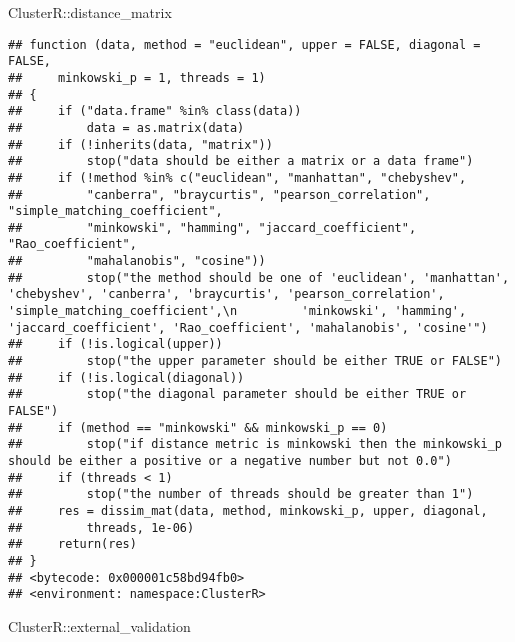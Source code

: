 \documentclass[
]{article}
\newenvironment{Shaded}{\begin{snugshade}}{\end{snugshade}}
\newcommand{\NormalTok}[1]{#1}
\newcommand{\SpecialCharTok}[1]{\textcolor[rgb]{0.00,0.00,0.00}{#1}}
\begin{document}
\begin{Shaded}
\begin{Highlighting}[]
\NormalTok{ClusterR}\SpecialCharTok{::}\NormalTok{distance\_matrix}
\end{Highlighting}
\end{Shaded}

\begin{verbatim}
## function (data, method = "euclidean", upper = FALSE, diagonal = FALSE, 
##     minkowski_p = 1, threads = 1) 
## {
##     if ("data.frame" %in% class(data)) 
##         data = as.matrix(data)
##     if (!inherits(data, "matrix")) 
##         stop("data should be either a matrix or a data frame")
##     if (!method %in% c("euclidean", "manhattan", "chebyshev", 
##         "canberra", "braycurtis", "pearson_correlation", "simple_matching_coefficient", 
##         "minkowski", "hamming", "jaccard_coefficient", "Rao_coefficient", 
##         "mahalanobis", "cosine")) 
##         stop("the method should be one of 'euclidean', 'manhattan', 'chebyshev', 'canberra', 'braycurtis', 'pearson_correlation', 'simple_matching_coefficient',\n         'minkowski', 'hamming', 'jaccard_coefficient', 'Rao_coefficient', 'mahalanobis', 'cosine'")
##     if (!is.logical(upper)) 
##         stop("the upper parameter should be either TRUE or FALSE")
##     if (!is.logical(diagonal)) 
##         stop("the diagonal parameter should be either TRUE or FALSE")
##     if (method == "minkowski" && minkowski_p == 0) 
##         stop("if distance metric is minkowski then the minkowski_p should be either a positive or a negative number but not 0.0")
##     if (threads < 1) 
##         stop("the number of threads should be greater than 1")
##     res = dissim_mat(data, method, minkowski_p, upper, diagonal, 
##         threads, 1e-06)
##     return(res)
## }
## <bytecode: 0x000001c58bd94fb0>
## <environment: namespace:ClusterR>
\end{verbatim}

\begin{Shaded}
\begin{Highlighting}[]
\NormalTok{ClusterR}\SpecialCharTok{::}\NormalTok{external\_validation}
\end{Highlighting}
\end{Shaded}
\end{document}
